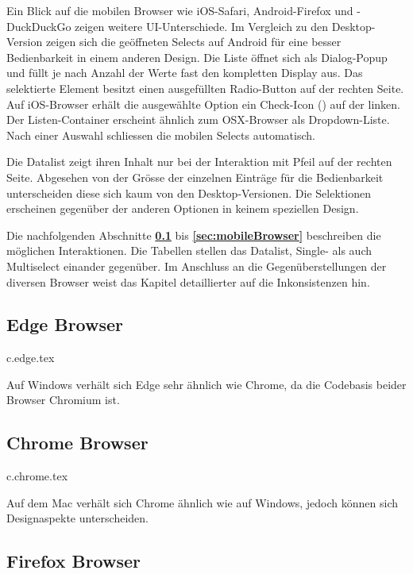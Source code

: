 Ein Blick auf die mobilen Browser wie iOS-Safari, Android-Firefox und -DuckDuckGo zeigen weitere UI-Unterschiede.
Im Vergleich zu den Desktop-Version zeigen sich die geöffneten Selects auf Android für eine besser Bedienbarkeit in einem anderen Design.
Die Liste öffnet sich als Dialog-Popup und füllt je nach Anzahl der Werte fast den kompletten Display aus.
Das selektierte Element besitzt einen ausgefüllten Radio-Button auf der rechten Seite. 
Auf iOS-Browser erhält die ausgewählte Option ein Check-Icon (\cmark) auf der linken.
Der Listen-Container erscheint ähnlich zum OSX-Browser als Dropdown-Liste.
Nach einer Auswahl schliessen die mobilen Selects automatisch.

Die Datalist zeigt ihren Inhalt nur bei der Interaktion mit Pfeil auf der rechten Seite.
Abgesehen von der Grösse der einzelnen Einträge für die Bedienbarkeit unterscheiden diese sich kaum von den Desktop-Versionen.
Die Selektionen erscheinen gegenüber der anderen Optionen in keinem speziellen Design.

Die nachfolgenden Abschnitte \textbf{\ref{sec:edgeBrowser}} bis \textbf{\ref{sec:mobileBrowser}} beschreiben die möglichen Interaktionen.
Die Tabellen stellen das Datalist, Single- als auch Multiselect einander gegenüber.
Im Anschluss an die Gegenüberstellungen der diversen Browser weist das Kapitel \textbf{} detaillierter auf die Inkonsistenzen hin. 


\clearpage
\subsection{Edge Browser}
\label{sec:edgeBrowser}

{c.edge.tex}

Auf Windows verhält sich Edge sehr ähnlich wie Chrome, da die Codebasis beider Browser Chromium ist.


\clearpage
\subsection{Chrome Browser}
\label{sec:chromeBrowser}

{c.chrome.tex}

Auf dem Mac verhält sich Chrome ähnlich wie auf Windows, jedoch können sich Designaspekte unterscheiden. 


\clearpage
\subsection{Firefox Browser}
\label{sec:firefoxBrowser}

